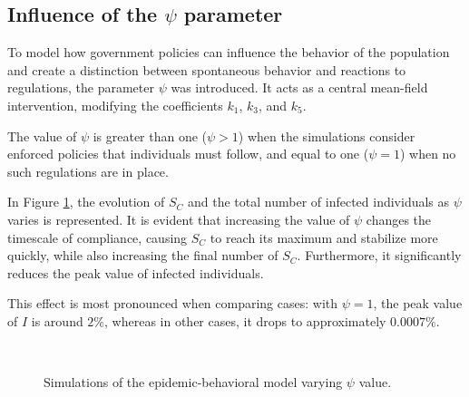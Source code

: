 \subsection{Influence of the $\psi$ parameter}
To model how government policies can influence the behavior of the population and create a distinction between spontaneous behavior and reactions to regulations, the parameter $\psi$ was introduced. It acts as a central mean-field intervention, modifying the coefficients $k_1$, $k_3$, and $k_5$.

The value of $\psi$ is greater than one ($\psi > 1$) when the simulations consider enforced policies that individuals must follow, and equal to one ($\psi = 1$) when no such regulations are in place.

In Figure \ref{fig:sim_psi}, the evolution of $S_C$ and the total number of infected individuals as $\psi$ varies is represented. It is evident that increasing the value of $\psi$ changes the timescale of compliance, causing $S_C$ to reach its maximum and stabilize more quickly, while also increasing the final number of $S_C$. Furthermore, it significantly reduces the peak value of infected individuals.

This effect is most pronounced when comparing cases: with $\psi = 1$, the peak value of $I$ is around $2\%$, whereas in other cases, it drops to approximately $0.0007\%$.
\begin{figure}[h]
	\centering
	 \quad
	 \\
	\caption[Simulation varying $\psi$]{Simulations of the epidemic-behavioral model varying $\psi$ value.}
	\label{fig:sim_psi}
\end{figure}
